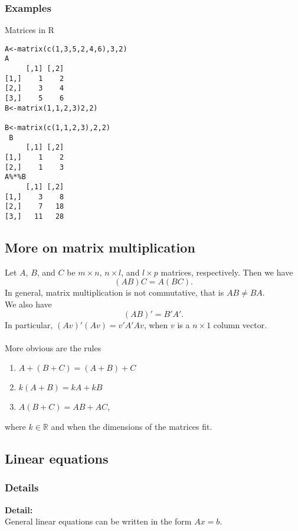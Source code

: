 \documentclass[12pt,a4paper]{article}
\theoremstyle{regla}
\theoremstyle{remark}
\theoremstyle{definition}
\theoremstyle{nonumberbreak}
\begin{document}
\subsubsection{Examples}
\begin{xmpl}
Matrices in R
\begin{lstlisting}
A<-matrix(c(1,3,5,2,4,6),3,2)
A
     [,1] [,2]
[1,]    1    2
[2,]    3    4
[3,]    5    6
B<-matrix(1,1,2,3)2,2)

B<-matrix(c(1,1,2,3),2,2)
 B
     [,1] [,2]
[1,]    1    2
[2,]    1    3
A%*%B
     [,1] [,2]
[1,]    3    8
[2,]    7   18
[3,]   11   28
\end{lstlisting}
\end{xmpl}

\subsection{More on matrix multiplication}
\begin{fbox}
\begin{minipage}{0.97\textwidth}
Let $A$, $B$, and $C$ be $m\times n$, $n\times l$, and $l\times p$ matrices, respectively. Then we have
$$
(AB)C=A(BC).
$$
In general, matrix multiplication is not commutative, that is $AB\neq BA$.\\
We also have
$$
(AB)'=B'A'.
$$
In particular, $(Av)'(Av)=v'A'Av$, when $v$ is a $n\times1$ column vector.\\\\
More obvious are the rules
\begin{enumerate}
\item $A+(B+C)=(A+B)+C$
\item $k(A+B)=kA+kB$
\item $A(B+C)=AB+AC$,
\end{enumerate}
where $k\in\mathbb{R}$ and when the dimensions of the matrices fit.
\end{minipage}
\end{fbox}

\subsection{Linear equations}
\subsubsection{Details}
{\bf Detail:}\\
General linear equations can be written in the form $Ax=b$.
\end{document}
